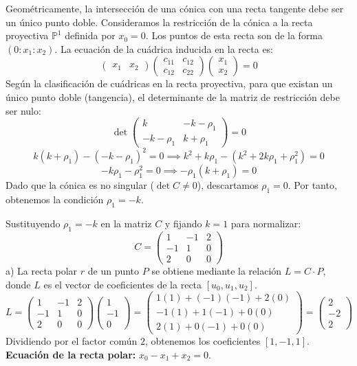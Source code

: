 {Geométricamente, la intersección de una cónica con una recta tangente debe ser un único punto doble. Consideramos la restricción de la cónica a la recta proyectiva $\mathbb{P}^1$ definida por $x_0 = 0$. Los puntos de esta recta son de la forma $(0:x_1:x_2)$. La ecuación de la cuádrica inducida en la recta es:
\[
\begin{pmatrix} x_1 & x_2 \end{pmatrix} 
\begin{pmatrix} c_{11} & c_{12} \\ c_{12} & c_{22} \end{pmatrix} 
\begin{pmatrix} x_1 \\ x_2 \end{pmatrix} = 0
\]
Según la clasificación de cuádricas en la recta proyectiva, para que existan un único punto doble (tangencia), el determinante de la matriz de restricción debe ser nulo:
\[
\det \begin{pmatrix} k & -k-\rho_1 \\ -k-\rho_1 & k+\rho_1 \end{pmatrix} = 0
\]
\[
k(k+\rho_1) - (-k-\rho_1)^2 = 0 \implies k^2 + k\rho_1 - (k^2 + 2k\rho_1 + \rho_1^2) = 0
\]
\[
-k\rho_1 - \rho_1^2 = 0 \implies -\rho_1(k + \rho_1) = 0
\]
Dado que la cónica es no singular ($\det C \neq 0$), descartamos $\rho_1 = 0$. Por tanto, obtenemos la condición $\rho_1 = -k$.



Sustituyendo $\rho_1 = -k$ en la matriz $C$ y fijando $k=1$ para normalizar:
\[
C = \begin{pmatrix} 
1 & -1 & 2 \\ 
-1 & 1 & 0 \\ 
2 & 0 & 0 
\end{pmatrix}
\]
a)
La recta polar $r$ de un punto $P$ se obtiene mediante la relación $L = C \cdot P$, donde $L$ es el vector de coeficientes de la recta $[u_0, u_1, u_2]$.
\[
L = \begin{pmatrix} 1 & -1 & 2 \\ -1 & 1 & 0 \\ 2 & 0 & 0 \end{pmatrix} \begin{pmatrix} 1 \\ -1 \\ 0 \end{pmatrix} = 
\begin{pmatrix} 1(1) + (-1)(-1) + 2(0) \\ -1(1) + 1(-1) + 0(0) \\ 2(1) + 0(-1) + 0(0) \end{pmatrix} = 
\begin{pmatrix} 2 \\ -2 \\ 2 \end{pmatrix}
\]
Dividiendo por el factor común $2$, obtenemos los coeficientes $[1, -1, 1]$. \\
\textbf{Ecuación de la recta polar:} $x_0 - x_1 + x_2 = 0$.

}
